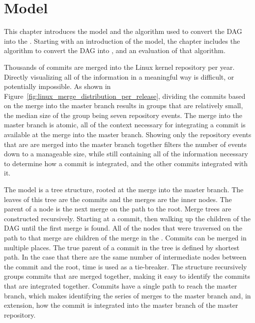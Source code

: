 \chapter{Model}\label{chap:model}

This chapter introduces the \mt{} model and the algorithm used to
convert the DAG into the . Starting with an introduction of the
\mt{} model, the chapter includes the algorithm to convert the DAG into
, and an evaluation of that algorithm.

Thousands of commits are merged into the Linux kernel repository per
year.
Directly visualizing all of the information in a meaningful way is
difficult, or potentially impossible.
As shown in Figure~\ref{fig:linux_merge_distribution_per_release},
dividing the commits based on the merge into the master branch results
in groups that are relatively small,
the median size of the group being seven repository events.
The merge into the master branch is atomic, all of the context necessary
for integrating a commit is available at the merge into the master
branch.
Showing only the repository events that are are merged into the master
branch together filters the number of events down to a manageable size,
while still containing all of the information necessary to determine how
a commit is integrated, and the other commits integrated with it.


The \mt{} model is a tree structure,
rooted at the merge into the master branch.
The leaves of this tree are the commits and the merges are the inner
nodes.
The parent of a node is the next merge on the path to the root.
Merge trees are constructed recursively.
Starting at a commit, then walking up the children of the DAG until the
first merge is found.
All of the nodes that were traversed on the path to that merge are
children of the merge in the \mt{}.
Commits can be merged in multiple places.
The true parent of a commit in the tree is defined by shortest path.
In the case that there are the same number of intermediate nodes
between the commit and the root, time is used as a tie-breaker.
The structure recursively groups commits that are merged together,
making it easy to identify the commits that are integrated together.
Commits have a single path to reach the master branch, which makes
identifying the series of merges to the master branch and, in extension,
how the commit is integrated into the master branch of the master
repository.

